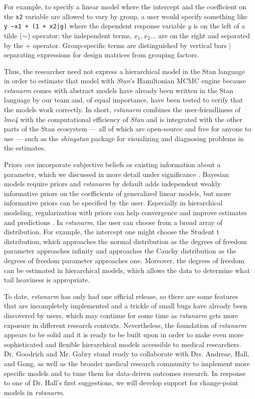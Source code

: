 \documentclass[11pt,notitlepage]{article}
\begin{document}
For example, to specify a linear model where the intercept and the coefficient on the \texttt{x2} 
variable are allowed to vary by group, a user would specify something like \texttt{y \textasciitilde x1 + (1 + x2|g)}
where the dependent response variable $y$ is on the left of a tilde ($\sim$) operator; 
the independent terms, $x_1, x_2...$ are on the right and separated by the $+$ 
operator. Group-specific terms are distinguished by vertical bars $|$ separating expressions for design matrices from grouping factors.

Thus, the researcher need not express a hierarchical model in the Stan language in order to estimate that model with \textit{Stan}'s Hamiltonian
MCMC engine because \textit{rstanarm} comes with abstract models have already been written in the Stan language by 
our team and, of equal importance, have been tested to verify that the models work correctly. In short, 
\textit{rstanarm} combines the user-friendliness of \textit{lme4} with the 
computational efficiency of \textit{Stan} and is integrated with the other parts of the Stan ecosystem
--- all of which are open-source and free for anyone to use --- such as the \textit{shinystan} package for 
visualizing and diagnosing problems in the estimates.

Priors \textit{can} incorporate subjective beliefs or existing information about a parameter,  
which we discussed in more detail under significance \cite{carlin1997bayes}. 
Bayesian models require priors and \textit{rstanarm} by default 
adds independent weakly informative priors on the coefficients of generalized linear models, 
but more informative priors can be specified by the user. Especially in hierarchical modeling, 
regularization with priors can help convergence and improve estimates and predictions
\cite{Gelman-Hill_2014}. In \textit{rstanarm}, the user can choose from 
a broad array of distribution. For example, the intercept one might choose the 
Student t distribution, which approaches the normal distribution as the 
degrees of freedom parameter approaches infinity and approaches the Cauchy distribution as the
degrees of freedom parameter approaches one. Moreover, the degrees of freedom can be estimated
in hierarchical models, which allows the data to determine what tail heaviness is appropriate.

To date, \textit{rstanarm} has only had one official release, so there are some features that are 
incompletely implemented and a trickle of small bugs have already been discovered by users, which 
may continue for some time as \textit{rstanarm} gets more exposure in different research contexts.
Nevertheless, the foundation of \textit{rstanarm} appears to be solid and it is ready to be built
upon in order to make even more sophisticated and flexible hierarchical models accessible to medical researchers.
Dr. Goodrich and Mr. Gabry stand ready to collaborate with Drs. Andreae, Hall, and 
Gong, as well as the broader medical research community to implement more specific models and to tune them for data-driven outcomes research. 
In response to one of Dr. Hall's first suggestions, we will develop support for change-point models in \textit{rstanarm}.
\end{document}
